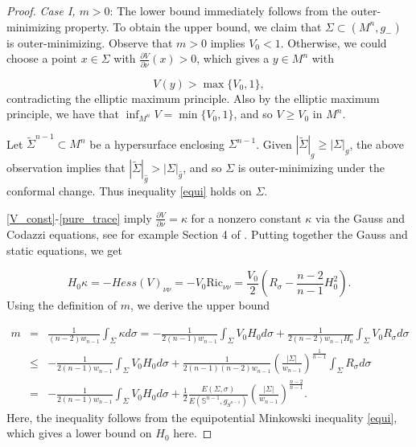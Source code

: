 \documentclass[12pt,twoside]{article}
\theoremstyle{plain}
\theoremstyle{definition}
\theoremstyle{remark}
\numberwithin{equation}{section}
\begin{document}
\begin{proof}
\textit{Case I, $m >0$}: The lower bound immediately follows from the outer-minimizing property. To obtain the upper bound, we claim that $\Sigma \subset (M^{n},g_{-})$ is outer-minimizing. Observe that $m>0$ implies $V_{0} < 1$. Otherwise, we could choose a point $x \in \Sigma$ with $\frac{\partial V}{\partial \nu}(x) > 0$, which gives a $y \in M^{n}$ with

\begin{equation*}
    V(y) > \max\{ V_{0}, 1 \},
\end{equation*}
contradicting the elliptic maximum principle. Also by the elliptic maximum principle, we have that $\inf_{M^{n}} V = \min \{ V_{0}, 1 \}$, and so $V \geq V_{0}$ in $M^{n}$.

Let $\widetilde{\Sigma}^{n-1} \subset M^{n}$ be a hypersurface enclosing $\Sigma^{n-1}$. Given $|\widetilde{\Sigma}|_{g} \geq |\Sigma|_{g}$, the above observation implies that $|\widetilde{\Sigma}|_{\widehat{g}} > |\Sigma|_{\widehat{g}}$, and so $\Sigma$ is outer-minimizing under the conformal change. Thus inequality \eqref{equi} holds on $\Sigma$.

\eqref{V_const}-\eqref{pure_trace} imply $\frac{\partial V}{\partial \nu} = \kappa$ for a nonzero constant $\kappa$ via the Gauss and Codazzi equations, see for example Section 4 of \cite{CG}. Putting together the Gauss and static equations, we get

\begin{equation*}
    H_{0} \kappa = -Hess (V)_{\nu \nu} = -V_{0} \text{Ric}_{\nu \nu} = \frac{V_{0}}{2} \left( R_{\sigma} - \frac{n-2}{n-1} H_{0}^{2} \right).
\end{equation*}
Using the definition of $m$, we derive the upper bound

\begin{eqnarray*}
    m &=& \frac{1}{(n-2)w_{n-1}} \int_{\Sigma} \kappa d\sigma = -\frac{1}{2(n-1)w_{n-1}} \int_{\Sigma} V_{0} H_{0} d\sigma + \frac{1}{2(n-2)w_{n-1}H_{0}} \int_{\Sigma} V_{0} R_{\sigma} d\sigma \\
    &\leq&  -\frac{1}{2(n-1)w_{n-1}} \int_{\Sigma} V_{0} H_{0} d\sigma + \frac{1}{2(n-1)(n-2)w_{n-1}} \left( \frac{|\Sigma|}{w_{n-1}} \right)^{\frac{1}{n-1}} \int_{\Sigma} R_{\sigma} d\sigma \\
    &=& -\frac{1}{2(n-1)w_{n-1}} \int_{\Sigma} V_{0} H_{0} d\sigma + \frac{1}{2} \frac{E(\Sigma,\sigma)}{E(\mathbb{S}^{n-1},g_{S^{n-1}})} \left( \frac{|\Sigma|}{w_{n-1}} \right)^{\frac{n-2}{n-1}}.
\end{eqnarray*}
Here, the inequality follows from the equipotential Minkowski inequality \eqref{equi}, which gives a lower bound on $H_{0}$ here.


\end{proof}
\end{document}
